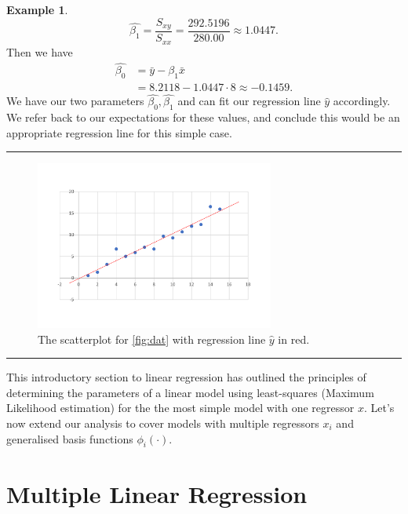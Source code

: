 \documentclass[10pt,a4paper]{article}
\numberwithin{equation}{section}
\theoremstyle{plain}
\theoremstyle{definition}
\theoremstyle{own}
\newtheorem{example}{Example}[section]
\begin{document}
\begin{example}
\begin{equation}
\hat{\beta_1} = \frac{S_{xy}}{S_{xx}} = \frac{292.5196}{280.00} \approx 1.0447.
\end{equation}
Then we have
\begin{align} \nonumber
\hat{\beta_0} & = \bar{y} - \beta_1 \bar{x} \\
 & = 8.2118 - 1.0447 \cdot 8  \approx -0.1459.
\end{align}
We have our two parameters $\hat{\beta_0}, \hat{\beta_1}$ and can fit our regression line $\hat{y}$ accordingly. We refer back to our expectations for these values, and conclude this would be an appropriate regression line for this simple case.
\pagebreak
\hrule
\begin{figure}[H]
\centering
\includegraphics[width = 0.7\textwidth]{data_graphmain}
\caption{The scatterplot for \cref{fig:dat} with regression line $\hat{y}$ in red.}
\label{fig:main}
\end{figure}
\end{example}
\hrule
\vspace{3mm}
This introductory section to linear regression has outlined the principles of determining the parameters of a linear model using least-squares (Maximum Likelihood estimation) for the the most simple model with one regressor $x$. Let's now extend our analysis to cover models with multiple regressors $x_i$ and generalised basis functions $\phi_i(\cdot)$.

\section{Multiple Linear Regression}
\end{document}
